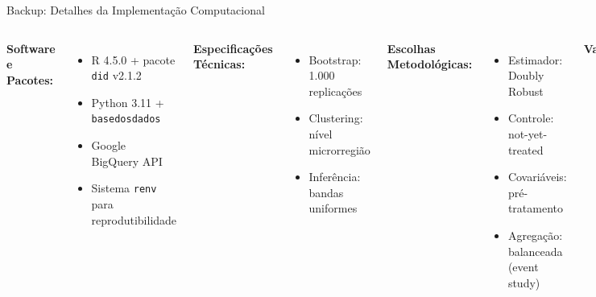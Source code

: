 \documentclass[10pt,aspectratio=169]{beamer}
\begin{document}
\begin{frame}{Backup: Detalhes da Implementação Computacional}
\begin{columns}
\textbf{Software e Pacotes:}
\begin{itemize}
    \item R 4.5.0 + pacote \texttt{did} v2.1.2
    \item Python 3.11 + \texttt{basedosdados}
    \item Google BigQuery API
    \item Sistema \texttt{renv} para reprodutibilidade
\end{itemize}

\textbf{Especificações Técnicas:}
\begin{itemize}
    \item Bootstrap: 1.000 replicações
    \item Clustering: nível microrregião
    \item Inferência: bandas uniformes
\end{itemize}

\textbf{Escolhas Metodológicas:}
\begin{itemize}
    \item Estimador: Doubly Robust
    \item Controle: not-yet-treated
    \item Covariáveis: pré-tratamento
    \item Agregação: balanceada (event study)
\end{itemize}

\textbf{Validações:}
\begin{itemize}
    \item Convergência do bootstrap
    \item Estabilidade numérica
    \item Sensibilidade a outliers
\end{itemize}
\end{columns}
\end{frame}
\end{document}
